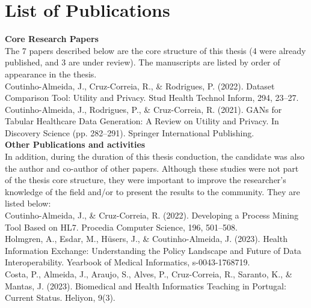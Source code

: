 \chapter*{List of Publications}



\textbf{Core Research Papers} \\
The 7 papers described below are the core structure of this thesis (4 were already published, and 3 are under review). The manuscripts are listed by order of appearance in the thesis.
\\

Coutinho-Almeida, J., Cruz-Correia, R., \& Rodrigues, P. (2022). Dataset Comparison Tool: Utility and Privacy. Stud Health Technol Inform, 294, 23–27.\\



Coutinho-Almeida, J., Rodrigues, P., \& Cruz-Correia, R. (2021). GANs for Tabular Healthcare Data Generation: A Review on Utility and Privacy. In Discovery Science (pp. 282–291). Springer International Publishing.\\

\textbf{Other Publications and activities}\\
In addition, during the duration of this thesis conduction, the candidate was also the author and co-author of other papers. Although these studies were not part of the thesis core structure, they were important to improve the researcher's knowledge of the field and/or to present the results to the community. They are listed below:\\


Coutinho-Almeida, J., \& Cruz-Correia, R. (2022). Developing a Process Mining Tool Based on HL7. Procedia Computer Science, 196, 501–508.\\


Holmgren, A., Esdar, M., Hüsers, J., \& Coutinho-Almeida, J. (2023). Health Information Exchange: Understanding the Policy Landscape and Future of Data Interoperability. Yearbook of Medical Informatics, s-0043-1768719.\\



Costa, P., Almeida, J., Araujo, S., Alves, P., Cruz-Correia, R., Saranto, K., \& Mantas, J. (2023). Biomedical and Health Informatics Teaching in Portugal: Current Status. Heliyon, 9(3).\\




